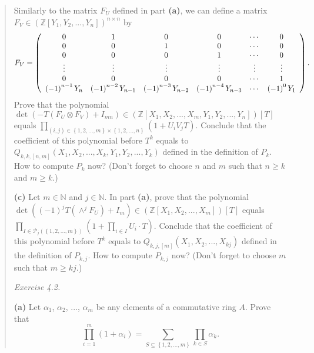 \documentclass[numbers=enddot,12pt,final,onecolumn,notitlepage]{scrartcl}%
\begin{document}
\begin{quotation}
Similarly to the matrix $F_{U}$ defined in part \textbf{(a)}, we can define a
matrix $F_{V}\in\left(  \mathbb{Z}\left[  Y_{1},Y_{2},...,Y_{n}\right]
\right)  ^{n\times n}$ by%
\[
F_{V}=\left(
\begin{array}
[c]{cccccc}%
0 & 1 & 0 & 0 & \cdots & 0\\
0 & 0 & 1 & 0 & \cdots & 0\\
0 & 0 & 0 & 1 & \cdots & 0\\
\vdots & \vdots & \vdots & \vdots & \vdots & \vdots\\
0 & 0 & 0 & 0 & \cdots & 1\\
\left(  -1\right)  ^{n-1}Y_{n} & \left(  -1\right)  ^{n-2}Y_{n-1} & \left(
-1\right)  ^{n-3}Y_{n-2} & \left(  -1\right)  ^{n-4}Y_{n-3} & \cdots & \left(
-1\right)  ^{0}Y_{1}%
\end{array}
\right)  .
\]
Prove that the polynomial $\det\left(  -T\left(  F_{U}\otimes F_{V}\right)
+I_{mn}\right)  \in\left(  \mathbb{Z}\left[  X_{1},X_{2},...,X_{m},Y_{1}%
,Y_{2},...,Y_{n}\right]  \right)  \left[  T\right]  $ equals $\prod
\limits_{\left(  i,j\right)  \in\left\{  1,2,...,m\right\}  \times\left\{
1,2,...,n\right\}  }\left(  1+U_{i}V_{j}T\right)  .$ Conclude that the
coefficient of this polynomial before $T^{k}$ equals to $Q_{k,k,\left[
n,m\right]  }\left(  X_{1},X_{2},...,X_{k},Y_{1},Y_{2},...,Y_{k}\right)  $
defined in the definition of $P_{k}$. How to compute $P_{k}$ now? (Don't
forget to choose $n$ and $m$ such that $n\geq k$ and $m\geq k$.)

\textbf{(c)} Let $m\in\mathbb{N}$ and $j\in\mathbb{N}$. In part \textbf{(a)},
prove that the polynomial $\det\left(  \left(  -1\right)  ^{j}T\left(
\wedge^{j}F_{U}\right)  +I_{m}\right)  \in\left(  \mathbb{Z}\left[
X_{1},X_{2},...,X_{m}\right]  \right)  \left[  T\right]  $ equals
$\prod\limits_{I\in\mathcal{P}_{j}\left(  \left\{  1,2,...,m\right\}  \right)
}\left(  1+\prod\limits_{i\in I}U_{i}\cdot T\right)  $. Conclude that the
coefficient of this polynomial before $T^{k}$ equals to $Q_{k,j,\left[
m\right]  }\left(  X_{1},X_{2},...,X_{kj}\right)  $ defined in the definition
of $P_{k,j}$. How to compute $P_{k,j}$ now? (Don't forget to choose $m$ such
that $m\geq kj$.)

\textit{Exercise 4.2.}

\textbf{(a)} Let $\alpha_{1}$, $\alpha_{2}$, $...$, $\alpha_{m}$ be any
elements of a commutative ring $A$. Prove that%
\[
\prod\limits_{i=1}^{m}\left(  1+\alpha_{i}\right)  =\sum\limits_{S\subseteq
\left\{  1,2,...,m\right\}  }\prod\limits_{k\in S}\alpha_{k}.
\]



\end{quotation}
\end{document}
